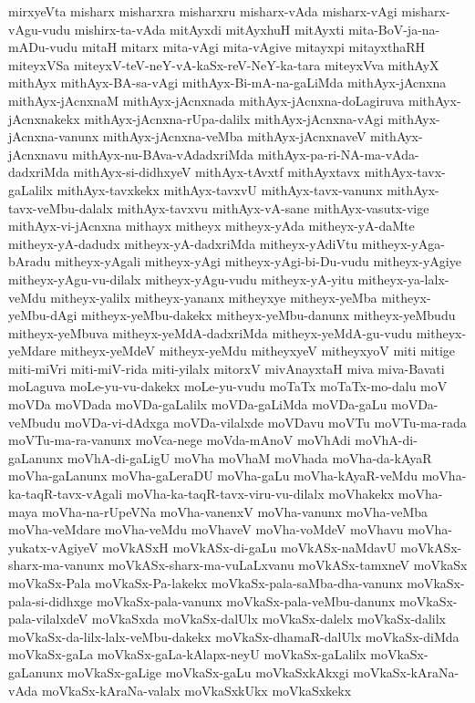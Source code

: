 {mirxyeVta
misharx
misharxra
misharxru
misharx-vAda
misharx-vAgi
misharx-vAgu-vudu
mishirx-ta-vAda
mitAyxdi
mitAyxhuH
mitAyxti
mita-BoV-ja-na-mADu-vudu
mitaH
mitarx
mita-vAgi
mita-vAgive
mitayxpi
mitayxthaRH
miteyxVSa
miteyxV-teV-neY-vA-kaSx-reV-NeY-ka-tara
miteyxVva
mithAyX
mithAyx
mithAyx-BA-sa-vAgi
mithAyx-Bi-mA-na-gaLiMda
mithAyx-jAcnxna
mithAyx-jAcnxnaM
mithAyx-jAcnxnada
mithAyx-jAcnxna-doLagiruva
mithAyx-jAcnxnakekx
mithAyx-jAcnxna-rUpa-dalilx
mithAyx-jAcnxna-vAgi
mithAyx-jAcnxna-vanunx
mithAyx-jAcnxna-veMba
mithAyx-jAcnxnaveV
mithAyx-jAcnxnavu
mithAyx-nu-BAva-vAdadxriMda
mithAyx-pa-ri-NA-ma-vAda-dadxriMda
mithAyx-si-didhxyeV
mithAyx-tAvxtf
mithAyxtavx
mithAyx-tavx-gaLalilx
mithAyx-tavxkekx
mithAyx-tavxvU
mithAyx-tavx-vanunx
mithAyx-tavx-veMbu-dalalx
mithAyx-tavxvu
mithAyx-vA-sane
mithAyx-vasutx-vige
mithAyx-vi-jAcnxna
mithayx
mitheyx
mitheyx-yAda
mitheyx-yA-daMte
mitheyx-yA-dadudx
mitheyx-yA-dadxriMda
mitheyx-yAdiVtu
mitheyx-yAga-bAradu
mitheyx-yAgali
mitheyx-yAgi
mitheyx-yAgi-bi-Du-vudu
mitheyx-yAgiye
mitheyx-yAgu-vu-dilalx
mitheyx-yAgu-vudu
mitheyx-yA-yitu
mitheyx-ya-lalx-veMdu
mitheyx-yalilx
mitheyx-yananx
mitheyxye
mitheyx-yeMba
mitheyx-yeMbu-dAgi
mitheyx-yeMbu-dakekx
mitheyx-yeMbu-danunx
mitheyx-yeMbudu
mitheyx-yeMbuva
mitheyx-yeMdA-dadxriMda
mitheyx-yeMdA-gu-vudu
mitheyx-yeMdare
mitheyx-yeMdeV
mitheyx-yeMdu
mitheyxyeV
mitheyxyoV
miti
mitige
miti-miVri
miti-miV-rida
miti-yilalx
mitorxV
mivAnayxtaH
miva
miva-Bavati
moLaguva
moLe-yu-vu-dakekx
moLe-yu-vudu
moTaTx
moTaTx-mo-dalu
moV
moVDa
moVDada
moVDa-gaLalilx
moVDa-gaLiMda
moVDa-gaLu
moVDa-veMbudu
moVDa-vi-dAdxga
moVDa-vilalxde
moVDavu
moVTu
moVTu-ma-rada
moVTu-ma-ra-vanunx
moVca-nege
moVda-mAnoV
moVhAdi
moVhA-di-gaLanunx
moVhA-di-gaLigU
moVha
moVhaM
moVhada
moVha-da-kAyaR
moVha-gaLanunx
moVha-gaLeraDU
moVha-gaLu
moVha-kAyaR-veMdu
moVha-ka-taqR-tavx-vAgali
moVha-ka-taqR-tavx-viru-vu-dilalx
moVhakekx
moVha-maya
moVha-na-rUpeVNa
moVha-vanenxV
moVha-vanunx
moVha-veMba
moVha-veMdare
moVha-veMdu
moVhaveV
moVha-voMdeV
moVhavu
moVha-yukatx-vAgiyeV
moVkASxH
moVkASx-di-gaLu
moVkASx-naMdavU
moVkASx-sharx-ma-vanunx
moVkASx-sharx-ma-vuLaLxvanu
moVkASx-tamxneV
moVkaSx
moVkaSx-Pala
moVkaSx-Pa-lakekx
moVkaSx-pala-saMba-dha-vanunx
moVkaSx-pala-si-didhxge
moVkaSx-pala-vanunx
moVkaSx-pala-veMbu-danunx
moVkaSx-pala-vilalxdeV
moVkaSxda
moVkaSx-dalUlx
moVkaSx-dalelx
moVkaSx-dalilx
moVkaSx-da-lilx-lalx-veMbu-dakekx
moVkaSx-dhamaR-dalUlx
moVkaSx-diMda
moVkaSx-gaLa
moVkaSx-gaLa-kAlapx-neyU
moVkaSx-gaLalilx
moVkaSx-gaLanunx
moVkaSx-gaLige
moVkaSx-gaLu
moVkaSxkAkxgi
moVkaSx-kAraNa-vAda
moVkaSx-kAraNa-valalx
moVkaSxkUkx
moVkaSxkekx
}
